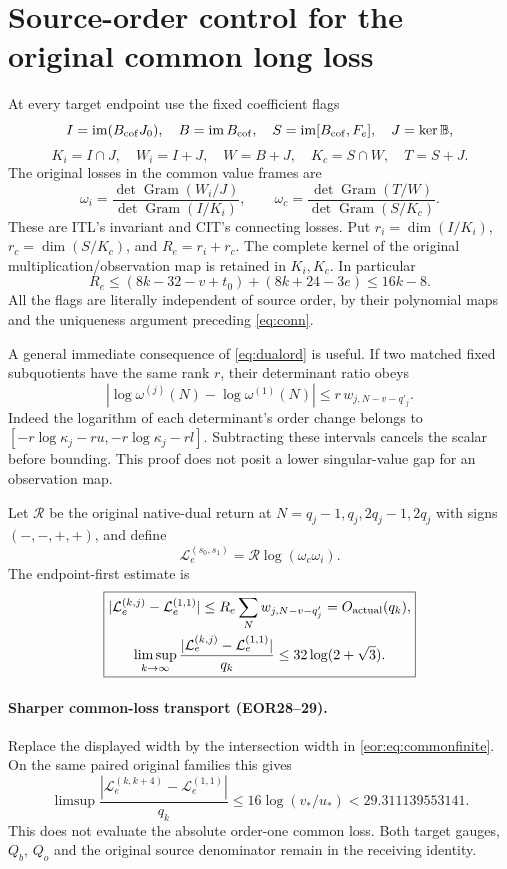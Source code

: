 \documentclass[11pt,a4paper]{article}
\DeclareMathOperator{\im}{im}
\DeclareMathOperator{\Gr}{Gram}
\begin{document}
\section{Source-order control for the original common long loss}
At every target endpoint use the fixed coefficient flags
\[
 I=\im(B_{\rm cof}J_0),\quad B=\im B_{\rm cof},\quad
 S=\im[B_{\rm cof},F_e],\quad J=\ker\mathbb B,
\]
\[
 K_i=I\cap J,\quad W_i=I+J,\quad W=B+J,\quad
 K_c=S\cap W,\quad T=S+J.
\]
The original losses in the common value frames are
\begin{equation}
 \omega_i=\frac{\det\Gr(W_i/J)}{\det\Gr(I/K_i)},\qquad
 \omega_c=\frac{\det\Gr(T/W)}{\det\Gr(S/K_c)}.
 \label{eq:loss}
\end{equation}
These are ITL's invariant and CIT's connecting losses. Put $r_i=\dim(I/K_i)$, $r_c=\dim(S/K_c)$, and $R_e=r_i+r_c$. The complete kernel of the original multiplication/observation map is retained in $K_i,K_c$. In particular
\[
 R_e\le(8k-32-v+t_0)+(8k+24-3e)\le16k-8.
\]
All the flags are literally independent of source order, by their polynomial maps and the uniqueness argument preceding \eqref{eq:conn}.

A general immediate consequence of \eqref{eq:dualord} is useful. If two matched fixed subquotients have the same rank $r$, their determinant ratio obeys
\begin{equation}
 \left|\log\omega^{(j)}(N)-\log\omega^{(1)}(N)\right|
 \le r\,w_{j,N-v-q'_j}.
 \label{eq:ratcompare}
\end{equation}
Indeed the logarithm of each determinant's order change belongs to $[-r\log\kappa_j-ru,-r\log\kappa_j-rl]$. Subtracting these intervals cancels the scalar before bounding. This proof does not posit a lower singular-value gap for an observation map.

Let $\mathcal R$ be the original native-dual return at $N=q_j-1,q_j,2q_j-1,2q_j$ with signs $(-,-,+,+)$, and define
\[
 \mathcal L_e^{(s_0,s_1)}=\mathcal R\log(\omega_c\omega_i).
\]
The endpoint-first estimate is
\begin{equation}
\boxed{\begin{gathered}
 |\mathcal L_e^{(k,j)}-\mathcal L_e^{(1,1)}|
 \le R_e\sum_N w_{j,N-v-q'_j}=O_{\rm actual}(q_k),\\
 \limsup_{k\to\infty}\frac{|\mathcal L_e^{(k,j)}-\mathcal L_e^{(1,1)}|}{q_k}
 \le32\log(2+\sqrt3).
\end{gathered}}
\label{eq:long}
\end{equation}
\paragraph{Sharper common-loss transport (EOR28--29).}
Replace the displayed width by the intersection width in
\eqref{eor:eq:commonfinite}. On the same paired original families this gives
\[
 \limsup\frac{|\mathcal L_e^{(k,k+4)}-\mathcal L_e^{(1,1)}|}{q_k}
 \le16\log(v_*/u_*)<29.311139553141.
\]
This does not evaluate the absolute order-one common loss. Both target gauges,
$Q_b$, $Q_o$ and the original source denominator remain in the receiving identity.
\end{document}
